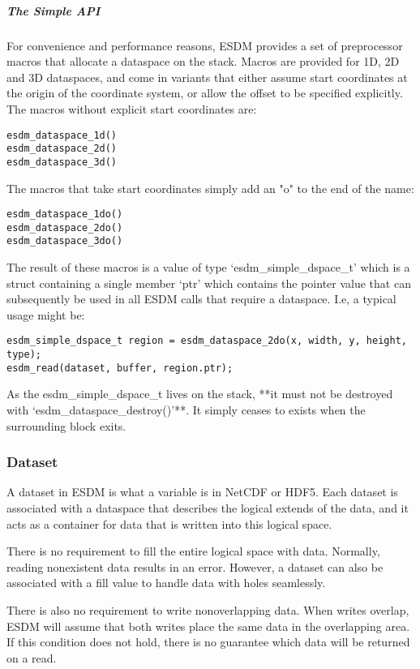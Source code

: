 \subparagraph{The Simple API}%

For convenience and performance reasons, ESDM provides a set of
preprocessor macros that allocate a dataspace on the stack. Macros are
provided for 1D, 2D and 3D dataspaces, and come in variants that either
assume start coordinates at the origin of the coordinate system, or
allow the offset to be specified explicitly. The macros without explicit
start coordinates are:

\begin{lstlisting}
esdm_dataspace_1d()
esdm_dataspace_2d()
esdm_dataspace_3d()
\end{lstlisting}

The macros that take start coordinates simply add an "o" to the end of
the name:

\begin{lstlisting}
esdm_dataspace_1do()
esdm_dataspace_2do()
esdm_dataspace_3do()
\end{lstlisting}

The result of these macros is a value of type `esdm\_simple\_dspace\_t'
which is a struct containing a single member `ptr' which contains the
pointer value that can subsequently be used in all ESDM calls that
require a dataspace. I.e, a typical usage might be:

\begin{lstlisting}
esdm_simple_dspace_t region = esdm_dataspace_2do(x, width, y, height, type);
esdm_read(dataset, buffer, region.ptr);
\end{lstlisting}

As the esdm\_simple\_dspace\_t lives on the stack, **it must not be
destroyed with `esdm\_dataspace\_destroy()'**. It simply ceases to
exists when the surrounding block exits.

\subsubsection{Dataset}%

A dataset in ESDM is what a variable is in NetCDF or HDF5. Each dataset
is associated with a dataspace that describes the logical extends of the
data, and it acts as a container for data that is written into this
logical space.

There is no requirement to fill the entire logical space with data.
Normally, reading nonexistent data results in an error. However, a
dataset can also be associated with a fill value to handle data with
holes seamlessly.

There is also no requirement to write nonoverlapping data. When writes
overlap, ESDM will assume that both writes place the same data in the
overlapping area. If this condition does not hold, there is no guarantee
which data will be returned on a read.

